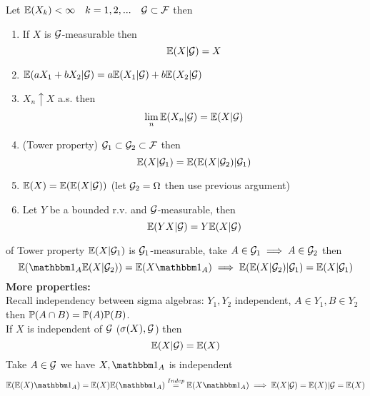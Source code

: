 \begin{thm}
Let $\mathbb{E}(X_k) <\infty \quad k = 1,2,... \quad \mathcal{G}\subset\mathcal{F}$ then
\begin{enumerate}
    \item If $X$ is $\mathcal{G}$-measurable then \begin{equation*}
        \mathbb{E}(X|\mathcal{G}) = X
    \end{equation*}
    \item $\mathbb{E}(aX_1 + bX_2 |\mathcal{G}) = a\mathbb{E}(X_1|\mathcal{G})+b\mathbb{E}(X_2 |\mathcal{G})$
    \item $X_n \uparrow X$ a.s. then \begin{equation*}
        \lim\limits_{n} \mathbb{E}(X_n|\mathcal{G}) = \mathbb{E}(X|\mathcal{G})
    \end{equation*}
    \item (Tower property) $\mathcal{G}_1\subset\mathcal{G}_2\subset\mathcal{F}$ then
    \begin{equation*}
        \mathbb{E}(X|\mathcal{G}_1) = \mathbb{E}(\mathbb{E}(X|\mathcal{G}_2)|\mathcal{G}_1)
    \end{equation*}
    \item $\mathbb{E}(X) = \mathbb{E}(\mathbb{E}(X|\mathcal{G}))$ (let $\mathcal{G}_2 = \Omega$ then use previous argument)
    \item Let $Y$ be a bounded r.v. and $\mathcal{G}$-measurable, then \begin{equation*}
        \mathbb{E}(YX|\mathcal{G}) = Y\mathbb{E}(X|\mathcal{G})
    \end{equation*}
\end{enumerate}
\end{thm}

\newpage
\pf of Tower property
$\mathbb{E}(X|\mathcal{G}_1)$ is $\mathcal{G}_1$-measurable, take $A\in \mathcal{G}_1 \implies A\in \mathcal{G}_2$ then 
\begin{equation*}
    \E(\I_A \E(X|\setg_2)) = \E(X\I_A) \implies \E(\E(X|\setg_2)|\setg_1) = \E(X|\setg_1) 
\end{equation*}
\textbf{More properties:} \\
Recall independency between sigma algebras: $Y_1, Y_2$ independent, $A\in Y_1, B\in Y_2$ then $\mathbb{P}(A\cap B) = \mathbb{P}(A)\mathbb{P}(B)$. \\
If $X$ is independent of $\mathcal{G}$ ($\sigma(X), \mathcal{G}$) then \begin{equation*}
    \mathbb{E}(X|\mathcal{G}) = \mathbb{E}(X)
\end{equation*}
\pf Take $A\in\mathcal{G}$ we have $X, \I_A$ is independent
\begin{align*}
    \E(\E(X)\I_A) = \E(X)\E(\I_A)\stackrel{Indep}{=} \E(X\I_A) \implies \E(X|\setg) = \E(X)|\setg = \E(X)
\end{align*}


